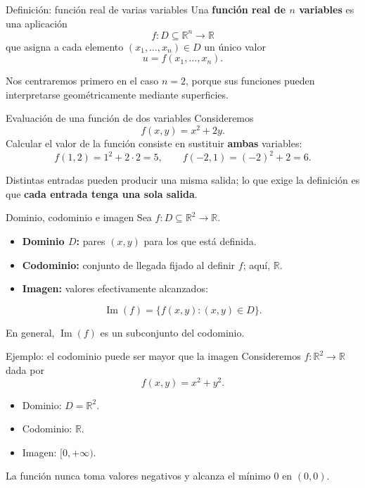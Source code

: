 \documentclass[main.tex]{subfiles}
\begin{document}
\begin{frame}{Definición: función real de varias variables}
Una \textbf{función real de $n$ variables} es una aplicación
\[
f:D\subseteq\mathbb R^n\longrightarrow\mathbb R
\]
que asigna a cada elemento $(x_1,\ldots,x_n)\in D$ un único valor
\[
u=f(x_1,\ldots,x_n).
\]
\medskip

Nos centraremos primero en el caso $n=2$, porque sus funciones pueden interpretarse geométricamente mediante superficies.
\end{frame}

\begin{frame}{Evaluación de una función de dos variables}
Consideremos
\[
f(x,y)=x^2+2y.
\]
Calcular el valor de la función consiste en sustituir \textbf{ambas} variables:
\[
f(1,2)=1^2+2\cdot2=5,\qquad
f(-2,1)=(-2)^2+2=6.
\]
\medskip

Distintas entradas pueden producir una misma salida; lo que exige la definición es que \textbf{cada entrada tenga una sola salida}.
\end{frame}

\begin{frame}{Dominio, codominio e imagen}
Sea $f:D\subseteq\mathbb R^2\to\mathbb R$.
\begin{itemize}
  \item \textbf{Dominio $D$:} pares $(x,y)$ para los que está definida.
  \item \textbf{Codominio:} conjunto de llegada fijado al definir $f$; aquí, $\mathbb R$.
  \item \textbf{Imagen:} valores efectivamente alcanzados:
\end{itemize}
\[
\operatorname{Im}(f)=\{f(x,y):(x,y)\in D\}.
\]
\medskip

En general, $\operatorname{Im}(f)$ es un subconjunto del codominio.
\end{frame}

\begin{frame}{Ejemplo: el codominio puede ser mayor que la imagen}
Consideremos $f:\mathbb R^2\to\mathbb R$ dada por
\[
f(x,y)=x^2+y^2.
\]
\begin{itemize}
  \item Dominio: $D=\mathbb R^2$.
  \item Codominio: $\mathbb R$.
  \item Imagen: $[0,+\infty)$.
\end{itemize}
\medskip

La función nunca toma valores negativos y alcanza el mínimo $0$ en $(0,0)$.
\end{frame}
\end{document}
